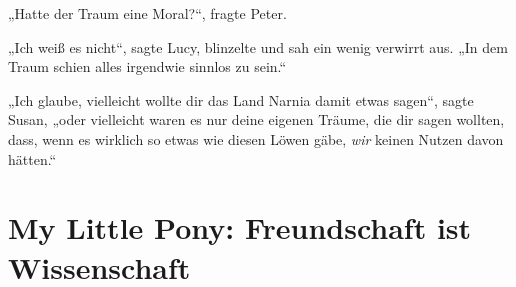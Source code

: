 „Hatte der Traum eine Moral?“, fragte Peter.

„Ich weiß es nicht“, sagte Lucy, blinzelte und sah ein wenig verwirrt aus. „In dem Traum schien alles irgendwie sinnlos zu sein.“

„Ich glaube, vielleicht wollte dir das Land Narnia damit etwas sagen“, sagte Susan, „oder vielleicht waren es nur deine eigenen Träume, die dir sagen wollten, dass, wenn es wirklich so etwas wie diesen Löwen gäbe, \emph{wir} keinen Nutzen davon hätten.“

\section{My Little Pony: Freundschaft ist Wissenschaft}

